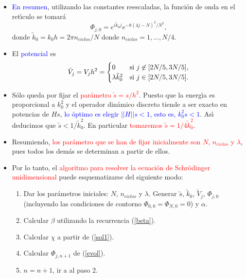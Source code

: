\documentclass[12pt]{iopart}
\def\az{\textcolor{blue}}
\def\ro{\textcolor{red}}
\begin{document}
\begin{itemize}
\item \az{En resumen}, utilizando las constantes reescaladas, la funci{\'o}n de onda en el ret{\'\i}culo se tomar{\'a}
%
\begin{equation}
\Phi_{j,0}=e^{i\tilde k_0 j} e^{-8(4j-N)^2/N^2},
\end{equation}
%
donde $\tilde k_0=k_0 h=2\pi n_{ciclos}/N$ donde $n_{ciclos}=1,...,N/4$. 

\item El \az{potencial} es
\begin{equation}
\tilde V_j =V_j h^2=
\begin{cases}
0  & \text{si  $j\not\in [2N/5,3N/5]$},  \cr
\lambda\tilde k_0^2 &  \text{si $j\in  [2N/5,3N/5]$}.
\end{cases}
\end{equation}
\vspace{0.2cm}

\item S\'olo queda por fijar el \ro{par{\'a}metro $\tilde s=s/h^2$}. Puesto que la energ{\'\i}a es proporcional a $k_0^2$
y el operador din{\'a}mico discreto tiende a ser exacto en potencias de $H s$, \az{lo {\'o}ptimo es elegir
$||H||s<1$, esto es, $k_0^2 s<1$}. As\'{\i} deducimos que $\tilde s < 1/\tilde k_0^2$. En particular \ro{tomaremos $\tilde s=1/4\tilde
k_0^2$}.

\item Resumiendo, \ro{los par{\'a}metro que se han de fijar inicialmente son $N$, $n_{ciclos}$ y $\lambda$}, pues todos
los dem{\'a}s se determinan a partir de ellos. 

\item Por lo tanto, el \ro{algoritmo para resolver la ecuaci{\'o}n de Schr\"odinger unidimensional} puede esquematizarse del siguiente modo:
%
\begin{enumerate}
\item Dar los par{\'a}metros iniciales: $N$, $n_{ciclos}$ y $\lambda$. Generar $\tilde s$, $\tilde k_0$, $\tilde V_j$,
$\Phi_{j,0}$ (incluyendo las condiciones de contorno $\Phi_{0,0}=\Phi_{N,0}=0$) y $\alpha$.
\item Calcular $\beta$ utilizando la recurrencia (\ref{beta}).
\item Calcular $\chi$ a partir de (\ref{sol1}).
\item Calcular $\Phi_{j,n+1}$ de (\ref{evol}).
\item $n=n+1$, ir a al paso 2.
\end{enumerate}

\end{itemize}
\end{document}
